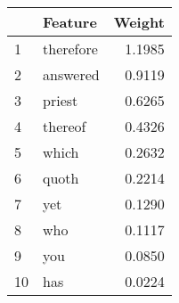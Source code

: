 \begin{tabular}{llr}
\toprule
{} &    Feature &  Weight \\
\midrule
1  &  therefore &  1.1985 \\
2  &   answered &  0.9119 \\
3  &     priest &  0.6265 \\
4  &    thereof &  0.4326 \\
5  &      which &  0.2632 \\
6  &      quoth &  0.2214 \\
7  &        yet &  0.1290 \\
8  &        who &  0.1117 \\
9  &        you &  0.0850 \\
10 &        has &  0.0224 \\
\bottomrule
\end{tabular}
